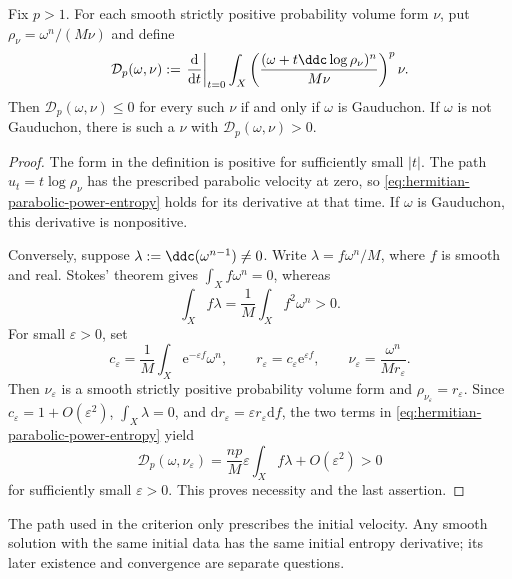\begin{proposition}\label{prop:gauduchon-initial-entropy-criterion}
Fix $p>1$. For each smooth strictly positive probability volume form $\nu$, put $\rho_\nu=\omega^n/(M\nu)$ and define
\[
 \mathcal D_p(\omega,\nu)
 :=\left.\frac{\mathrm{d}}{\mathrm{d}t}\right|_{t=0}
   \int_X\left(\frac{(\omega+t\ddc\log\rho_\nu)^n}{M\nu}\right)^p\nu.
\]
Then $\mathcal D_p(\omega,\nu)\leq0$ for every such $\nu$ if and only if $\omega$ is Gauduchon. If $\omega$ is not Gauduchon, there is such a $\nu$ with $\mathcal D_p(\omega,\nu)>0$.
\end{proposition}
\begin{proof}
The form in the definition is positive for sufficiently small $|t|$. The path $u_t=t\log\rho_\nu$ has the prescribed parabolic velocity at zero, so \eqref{eq:hermitian-parabolic-power-entropy} holds for its derivative at that time. If $\omega$ is Gauduchon, this derivative is nonpositive.

Conversely, suppose $\lambda:=\ddc(\omega^{n-1})\ne0$. Write $\lambda=f\omega^n/M$, where $f$ is smooth and real. Stokes' theorem gives $\int_Xf\omega^n=0$, whereas
\[
 \int_Xf\lambda=\frac1M\int_Xf^2\omega^n>0.
\]
For small $\varepsilon>0$, set
\[
 c_\varepsilon=\frac1M\int_X\mathrm{e}^{-\varepsilon f}\omega^n,
 \qquad r_\varepsilon=c_\varepsilon\mathrm{e}^{\varepsilon f},
 \qquad \nu_\varepsilon=\frac{\omega^n}{M r_\varepsilon}.
\]
Then $\nu_\varepsilon$ is a smooth strictly positive probability volume form and $\rho_{\nu_\varepsilon}=r_\varepsilon$. Since $c_\varepsilon=1+O(\varepsilon^2)$, $\int_X\lambda=0$, and $\mathrm{d}r_\varepsilon=\varepsilon r_\varepsilon\mathrm{d}f$, the two terms in \eqref{eq:hermitian-parabolic-power-entropy} yield
\[
 \mathcal D_p(\omega,\nu_\varepsilon)
 =\frac{np}M\varepsilon\int_Xf\lambda+O(\varepsilon^2)>0
\]
for sufficiently small $\varepsilon>0$. This proves necessity and the last assertion.
\end{proof}

The path used in the criterion only prescribes the initial velocity. Any smooth solution with the same initial data has the same initial entropy derivative; its later existence and convergence are separate questions.
